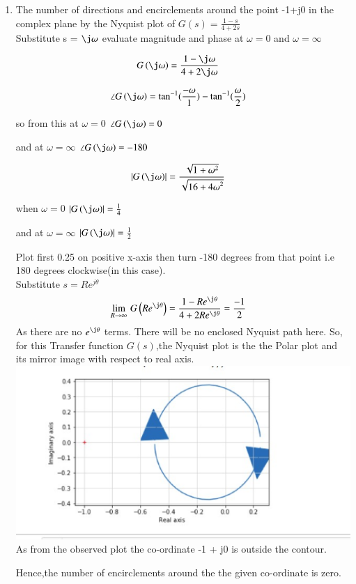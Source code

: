 \begin{enumerate}[label=\thesection.\arabic*.,ref=\thesection.\theenumi]
\item The number of directions and encirclements around the point -1+j0 in the complex plane by the Nyquist plot of $G(s) = \frac{1-s}{4+2s}$\\

\solution
Substitute s = $\j\omega$ evaluate magnitude and phase at $\omega = 0$ and $\omega = \infty$

\begin{align}
G\brak{\j\omega} &= \frac{1-\j\omega}{4+2\j\omega} 
\end{align}


\begin{align}
\angle G\brak{\j\omega} &= \tan^{-1}(\frac{-\omega}{1}) - \tan^{-1}(\frac{\omega}{2})
\end{align}

so from this  at $\omega = 0$ $\angle G\brak{\j\omega} = 0$ 

and at $\omega = \infty$ $\angle G\brak{\j\omega}  =-180$  

\begin{align}
\abs{G\brak{\j\omega}} &= \frac{\sqrt{1+{\omega}^2}}{\sqrt{16+{4\omega}^2}} 
\end{align}

when $\omega = 0$ $\abs{G\brak{\j\omega}} = \frac{1}{4}$ 

and at  $\omega = \infty$ $\abs{G\brak{\j\omega}} = \frac{1}{2}$

Plot first 0.25 on positive x-axis then turn {-180} degrees from that point i.e {180} degrees clockwise(in this case).\\
Substitute $s = Re^{j\theta}$
\begin{align}
\lim_{R\to \infty}\,G\brak{Re^{\j\theta}} &= \frac{1-Re^{\j\theta}}{4+2Re^{\j\theta}}=\frac{-1}{2}  
\end{align}
As there are no $e^{\j\theta}$ terms.
There will be no enclosed Nyquist path here.
So, for this Transfer function $G(s)$,the Nyquist plot is the the Polar plot and its mirror image with respect to real axis.
\includegraphics[width=\columnwidth]{./figs/pythonnyquistplot.eps}
As from the observed plot the co-ordinate -1 + j0 is outside the contour.

Hence,the number of encirclements around the the given co-ordinate is zero.
\end{enumerate}
